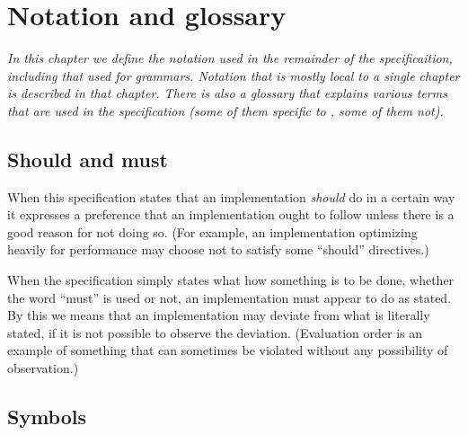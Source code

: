 %
%
%
%
%
%
%

\chapter{Notation and glossary}

\emph{In this chapter we define the notation used in the remainder of
the specificaition, including that used for grammars.  Notation that
is mostly local to a single chapter is described in that chapter.
There is also a glossary that explains various terms that are used in
the specification (some of them specific to \Erlang, some of them
not).}

\ifStd
\section{Should and must}

When this specification states that an implementation \emph{should} do
in a certain way it expresses a preference that an implementation
ought to follow unless there is a good reason for not doing so.  (For
example, an implementation optimizing heavily for performance may
choose not to satisfy some ``should'' directives.)

When the specification simply states what how something is to be done,
whether the word ``must'' is used or not, an implementation must
appear to do as stated.  By this we means that an implementation may
deviate from what is literally stated, if it is not possible to
observe the deviation.  (Evaluation order is an example of something
that can sometimes be violated without any possibility of
observation.)
\fi

\section{Symbols}

